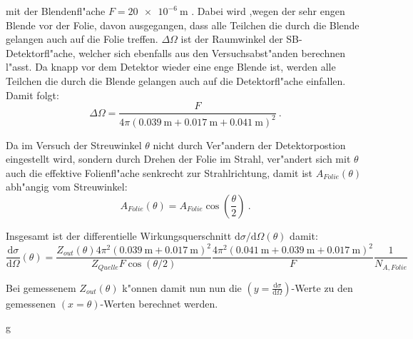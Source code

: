     mit der Blendenfl"ache $F=\SI{20e-6}{\meter}$ \cite{Anleitung}.
    Dabei wird ,wegen der sehr engen Blende vor der Folie, davon ausgegangen, dass alle Teilchen die durch die Blende gelangen auch auf die Folie treffen.
    $\Delta \Omega$ ist der Raumwinkel der SB-Detektorfl"ache, welcher sich ebenfalls aus den Versuchsabst"anden berechnen l"asst. Da knapp vor dem Detektor wieder eine enge Blende ist, werden alle Teilchen die durch die Blende gelangen auch auf die Detektorfl"ache einfallen. Damit folgt:
    \begin{equation}
      \Delta \Omega = \frac{F}{4\pi(\SI{0.039}{\meter}+\SI{0.017}{\meter}+\SI{0.041}{\meter})^2} \: .
    \end{equation}

    Da im Versuch der Streuwinkel $\theta$ nicht durch Ver"andern der Detektorpostion eingestellt wird, sondern durch Drehen der Folie im Strahl, ver"andert sich mit $\theta$ auch die effektive Folienfl"ache senkrecht zur Strahlrichtung, damit ist $A_{Folie}(\theta)$ abh"angig vom Streuwinkel:
    \begin{equation}
      A_{Folie}(\theta) = A_{Folie}\cos\left(\frac{\theta}{2}\right) \:.
    \end{equation}

    Insgesamt ist der differentielle Wirkungsquerschnitt $\text{d}\sigma/\text{d}\Omega(\theta)$ damit:
    \begin{equation}
      \frac{\text{d}\sigma}{\text{d}\Omega}(\theta) =  \frac{Z_{out}(\theta)4\pi^2(\SI{0,039}{\meter}+\SI{0,017}{\meter})^2}{Z_{Quelle}F\cos(\theta/2)}
      \frac{4\pi^2 (\SI{0,041}{\meter}+\SI{0,039}{\meter}+\SI{0.017}{\meter})^2}{F}\frac{1}{N_{A,Folie}}
      \label{querschnitt}
    \end{equation}

    Bei gemessenem $Z_{out}(\theta)$ k"onnen damit nun nun die $(y=\frac{\text{d}\sigma}{\text{d}\Omega})$-Werte zu den gemessenen $(x=\theta)$-Werten berechnet werden.


















    g
